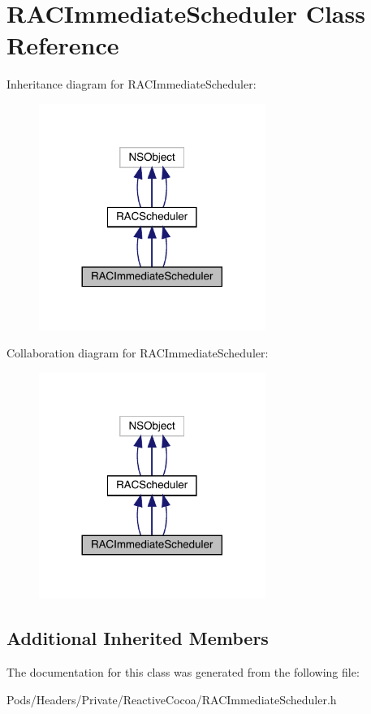 \hypertarget{interface_r_a_c_immediate_scheduler}{}\section{R\+A\+C\+Immediate\+Scheduler Class Reference}
\label{interface_r_a_c_immediate_scheduler}


Inheritance diagram for R\+A\+C\+Immediate\+Scheduler\+:\nopagebreak
\begin{figure}[H]
\begin{center}
\leavevmode
\includegraphics[width=209pt]{interface_r_a_c_immediate_scheduler__inherit__graph}
\end{center}
\end{figure}


Collaboration diagram for R\+A\+C\+Immediate\+Scheduler\+:\nopagebreak
\begin{figure}[H]
\begin{center}
\leavevmode
\includegraphics[width=209pt]{interface_r_a_c_immediate_scheduler__coll__graph}
\end{center}
\end{figure}
\subsection*{Additional Inherited Members}


The documentation for this class was generated from the following file\+:\begin{DoxyCompactItemize}
\item 
Pods/\+Headers/\+Private/\+Reactive\+Cocoa/R\+A\+C\+Immediate\+Scheduler.\+h\end{DoxyCompactItemize}
